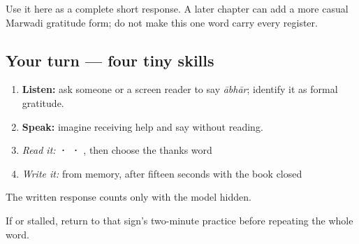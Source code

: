 Use it here as a complete short response. A later chapter can add a more casual Marwadi gratitude form; do not make this one word carry every register.

\subsection*{Your turn — four tiny skills}
\begin{enumerate}
\raggedright
  \item \textbf{Listen:} ask someone or a screen reader to say \emph{ābhār}; identify it as formal gratitude.
  \item \textbf{Speak:} imagine receiving help and say \textbf{} without reading.
  \item \emph{Read it:} \textbf{ ·  · }, then choose the thanks word
  \item \emph{Write it:} \textbf{} from memory, after fifteen seconds with the book closed
\end{enumerate}

The written response counts only with the model hidden.

\begin{tcolorbox}[breakable,colback=teal!4,colframe=teal!35!black,title={Before you move on}]
If \textbf{} or \textbf{} stalled, return to that sign's two-minute practice before repeating the whole word.
\end{tcolorbox}
